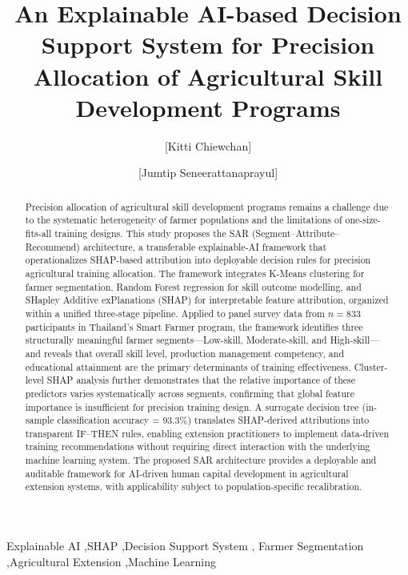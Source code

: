 \documentclass[3p,twocolumn,authoryear]{elsarticle}
\begin{document}
\begin{frontmatter}

\title{An Explainable AI-based Decision Support System for Precision
       Allocation of Agricultural Skill Development Programs}

\author[inst1]{[Kitti Chiewchan]}
\author[inst2]{[Jumtip Seneerattanaprayul]}

\address[inst1]{Computer Education, Faculty of Education,
  Bansomdejchaopraya Rajabhat University,
  1061 Issaraphap Road, Hirunrujee, Thonburi, Bangkok 10600, Thailand}
\address[inst2]{Department of Agricultural Economics,
  Faculty of Economics, Kasetsart University,
  50 Ngam Wong Wan Road, Ladyao, Jatujak, Bangkok 10110, Thailand}

\begin{abstract}
Precision allocation of agricultural skill development programs
remains a challenge due to the systematic heterogeneity of farmer
populations and the limitations of one-size-fits-all training designs.
This study proposes the SAR (Segment--Attribute--Recommend) architecture,
a transferable explainable-AI framework that operationalizes SHAP-based
attribution into deployable decision rules for precision agricultural
training allocation.
The framework integrates K-Means clustering for farmer segmentation,
Random Forest regression for skill outcome modelling, and SHapley
Additive exPlanations (SHAP) for interpretable feature attribution,
organized within a unified three-stage pipeline.
Applied to panel survey data from $n = 833$ participants in Thailand's
Smart Farmer program, the framework identifies three structurally
meaningful farmer segments---Low-skill, Moderate-skill, and High-skill---
and reveals that overall skill level, production management competency,
and educational attainment are the primary determinants of training
effectiveness.
Cluster-level SHAP analysis further demonstrates that the relative
importance of these predictors varies systematically across segments,
confirming that global feature importance is insufficient for precision
training design.
A surrogate decision tree (in-sample classification accuracy = 93.3\%)
translates SHAP-derived attributions into transparent IF--THEN rules,
enabling extension practitioners to implement data-driven training
recommendations without requiring direct interaction with the underlying
machine learning system.
The proposed SAR architecture provides a deployable and auditable
framework for AI-driven human capital development in agricultural
extension systems, with applicability subject to population-specific
recalibration.
\end{abstract}

\begin{keyword}
Explainable AI \sep SHAP \sep Decision Support System \sep
Farmer Segmentation \sep Agricultural Extension \sep Machine Learning
\end{keyword}

\end{frontmatter}
\end{document}
